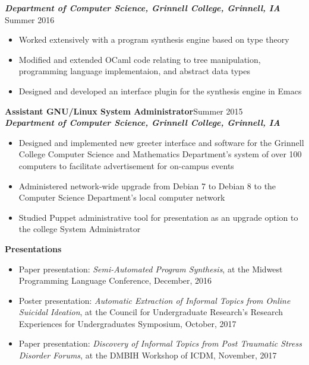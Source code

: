 \documentclass[9pt]{extarticle}
\begin{document}
\textbf{\textit{Department of Computer Science, Grinnell College,
    Grinnell, IA}}
\hfill Summer 2016
\begin{itemize}
\item Worked extensively with a program synthesis engine based on type theory
\item Modified and extended OCaml code relating to tree manipulation,
  programming language implementaion, and abstract data types
\item Designed and developed an interface plugin for the 
  synthesis engine in Emacs
\end{itemize}
\vspace{0.4cm}


\textbf{Assistant GNU/Linux System Administrator}\hfill Summer 2015\\
\textbf{\textit{Department of Computer Science, Grinnell College, Grinnell, IA}}
\begin{itemize}
\item Designed and implemented new greeter interface and 
  software for the Grinnell College Computer Science 
  and Mathematics Department's system of over 100 computers to 
  facilitate advertisement for on-campus events
\item Administered network-wide upgrade from Debian 7 to Debian 8 to
  the Computer Science Department's local computer network
\item Studied Puppet administrative tool for presentation as an upgrade option to the college System Administrator
\end{itemize}
\vspace{0.4cm}

\begin{large}
\begin{center}\textbf{Presentations}
\end{center}
\end{large}
\begin{itemize}
\item Paper presentation: \textit{Semi-Automated Program Synthesis}, at the Midwest Programming Language Conference,
  December, 2016
\item Poster presentation: \textit{Automatic
  Extraction of Informal Topics from Online Suicidal Ideation}, at the Council for Undergraduate Research's 
  Research Experiences for Undergraduates Symposium, October, 2017
\item Paper presentation: \textit{Discovery of Informal Topics from Post Traumatic Stress
  Disorder Forums}, at the DMBIH Workshop of ICDM, November, 2017
\end{itemize}
\end{document}
